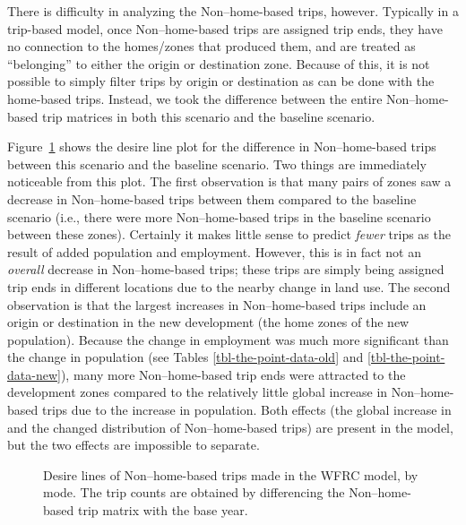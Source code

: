 \documentclass[fancy, oneside, mastersfancy, ms]{byuthesis}
\begin{document}
There is difficulty in analyzing the Non--home-based trips, however.
Typically in a trip-based model, once Non--home-based trips are assigned
trip ends, they have no connection to the homes/zones that produced
them, and are treated as ``belonging'' to either the origin or
destination zone. Because of this, it is not possible to simply filter
trips by origin or destination as can be done with the home-based trips.
Instead, we took the difference between the entire Non--home-based trip
matrices in both this scenario and the baseline scenario.

Figure~\ref{fig-lu-desire-cube-nhb} shows the desire line plot for the
difference in Non--home-based trips between this scenario and the
baseline scenario. Two things are immediately noticeable from this plot.
The first observation is that many pairs of zones saw a decrease in
Non--home-based trips between them compared to the baseline scenario
(i.e., there were more Non--home-based trips in the baseline scenario
between these zones). Certainly it makes little sense to predict
\emph{fewer} trips as the result of added population and employment.
However, this is in fact not an \emph{overall} decrease in
Non--home-based trips; these trips are simply being assigned trip ends
in different locations due to the nearby change in land use. The second
observation is that the largest increases in Non--home-based trips
include an origin or destination in the new development (the home zones
of the new population). Because the change in employment was much more
significant than the change in population (see Tables
\ref{tbl-the-point-data-old} and \ref{tbl-the-point-data-new}), many
more Non--home-based trip ends were attracted to the development zones
compared to the relatively little global increase in Non--home-based
trips due to the increase in population. Both effects (the global
increase in and the changed distribution of Non--home-based trips) are
present in the model, but the two effects are impossible to separate.

\begin{figure}


\caption[Desire lines of Non--home-based trips made in the WFRC
model.]{\label{fig-lu-desire-cube-nhb}Desire lines of Non--home-based
trips made in the WFRC model, by mode. The trip counts are obtained by
differencing the Non--home-based trip matrix with the base year.}

\end{figure}%
\end{document}

